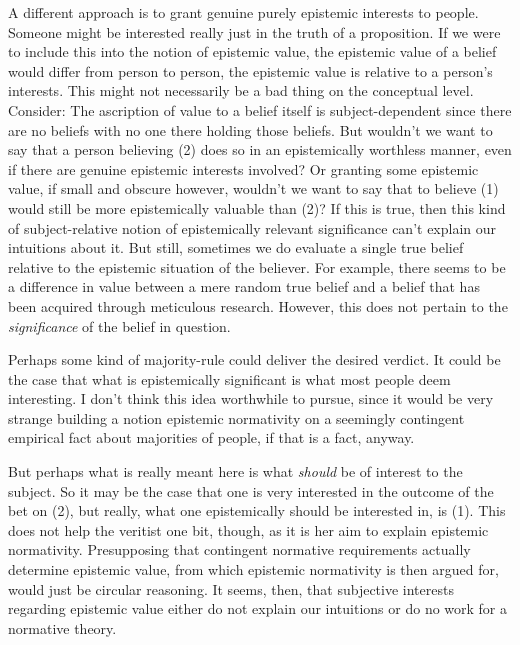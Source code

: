 \documentclass[12pt,numbers=noenddot]{scrartcl}
\begin{document}
A different approach is to grant genuine purely epistemic interests to people. Someone might be interested really just in the truth of a proposition. If we were to include this into the notion of epistemic value, the epistemic value of a belief would differ from person to person, the epistemic value is relative to a person's interests. This might not necessarily be a bad thing on the conceptual level. Consider: The ascription of value to a belief itself is subject-dependent since there are no beliefs with no one there holding those beliefs. But wouldn't we want to say that a person believing (2) does so in an epistemically worthless manner, even if there are genuine epistemic interests involved? Or granting some epistemic value, if small and obscure however, wouldn't we want to say that to believe (1) would still be more epistemically  valuable than (2)? If this is true, then this kind of subject-relative notion of epistemically relevant significance can't explain our intuitions about it. But still, sometimes we do evaluate a single true belief relative to the epistemic situation of the believer. For example, there seems to be a difference in value between a mere random true belief and a belief that has been acquired through meticulous research. However, this does not pertain to the \emph{significance} of the belief in question.

Perhaps some kind of majority-rule could deliver the desired verdict. It could be the case that what is epistemically significant is what most people deem interesting. I don't think this idea worthwhile to pursue, since it would be very strange building a notion epistemic normativity on a seemingly contingent empirical fact about majorities of people, if that is a fact, anyway.

But perhaps what is really meant here is what \emph{should} be of interest to the subject. So it may be the case that one is very interested in the outcome of the bet on (2), but really, what one epistemically should be interested in, is (1). This does not help the veritist one bit, though, as it is her aim to explain epistemic normativity. Presupposing that contingent normative requirements actually determine epistemic value, from which epistemic normativity is then argued for, would just be circular reasoning. It seems, then, that subjective interests regarding epistemic value either do not explain our intuitions or do no work for a normative theory.
\end{document}
